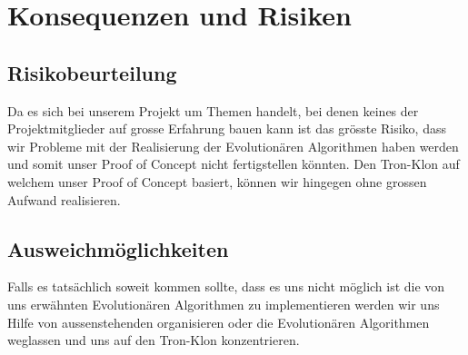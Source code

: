 \section{Konsequenzen und Risiken}
	\subsection{Risikobeurteilung}
	Da es sich bei unserem Projekt um Themen handelt, bei denen keines der Projektmitglieder auf grosse Erfahrung bauen kann ist das grösste Risiko, dass wir Probleme mit der Realisierung der Evolutionären Algorithmen haben werden und somit unser Proof of Concept nicht fertigstellen könnten. Den Tron-Klon auf welchem unser Proof of Concept basiert, können wir hingegen ohne grossen Aufwand realisieren.

\subsection{Ausweichmöglichkeiten}
Falls es tatsächlich soweit kommen sollte, dass es uns nicht möglich ist die von uns erwähnten Evolutionären Algorithmen zu implementieren werden wir uns Hilfe von aussenstehenden organisieren oder die Evolutionären Algorithmen weglassen und uns auf den Tron-Klon konzentrieren. 